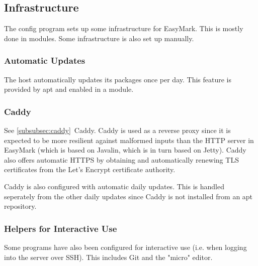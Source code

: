 \documentclass[12pt,a4paper,oneside]{report}
\begin{document}
	\subsection{Infrastructure}
	The config program sets up some infrastructure for EasyMark. This is mostly done in modules. Some infrastructure is also set up manually.

	\subsubsection{Automatic Updates}
	The host automatically updates its packages once per day. This feature is provided by apt and enabled in a module.

	\subsubsection{Caddy}
	See \ref{subsubsec:caddy}~Caddy. Caddy is used as a reverse proxy since it is expected to be more resilient against malformed inputs than the HTTP server in EasyMark (which is based on Javalin, which is in turn based on Jetty). Caddy also offers automatic HTTPS by obtaining and automatically renewing TLS certificates from the Let's Encrypt certificate authority.

	Caddy is also configured with automatic daily updates. This is handled seperately from the other daily updates since Caddy is not installed from an apt repository.

	\subsubsection{Helpers for Interactive Use}
	Some programs have also been configured for interactive use (i.e. when logging into the server over SSH). This includes Git and the "micro" editor.

	\printbibliography

	\pagebreak
	\listoffigures
\end{document}
